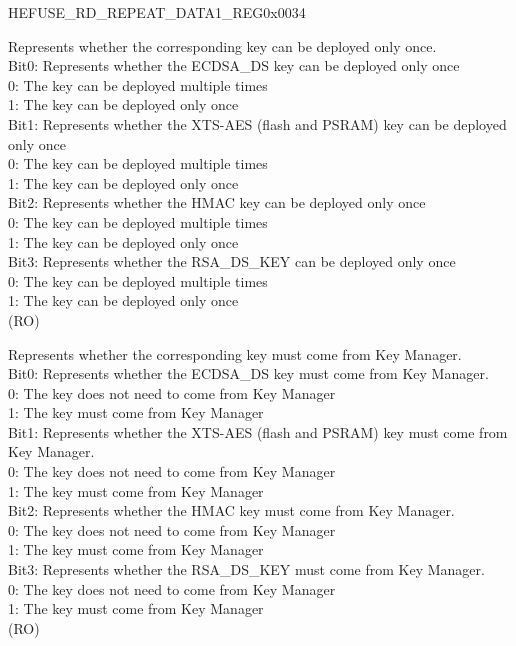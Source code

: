 \addtocounter{Regfloat}{-1}
\begin{register}{H}{EFUSE\_RD\_REPEAT\_DATA1\_REG}{0x0034}
\begin{regdesc}\begin{reglist}
\item [Continued from the previous page...]

\label{fielddesc:EFUSEKMDEPLOYONLYONCE}\item [EFUSE\_KM\_DEPLOY\_ONLY\_ONCE] Represents whether the corresponding key can be deployed only once.\\Bit0: Represents whether the ECDSA\_DS key can be deployed only once\\0: The key can be deployed multiple times\\1: The key can be deployed only once\\Bit1: Represents whether the XTS-AES (flash and PSRAM) key can be deployed only once\\0: The key can be deployed multiple times\\1: The key can be deployed only once\\Bit2: Represents whether the HMAC key can be deployed only once\\0: The key can be deployed multiple times\\1: The key can be deployed only once\\Bit3: Represents whether the RSA\_DS\_KEY can be deployed only once\\0: The key can be deployed multiple times\\1: The key can be deployed only once\\ (RO)
\label{fielddesc:EFUSEFORCEUSEKEYMANAGERKEY}\item [EFUSE\_FORCE\_USE\_KEY\_MANAGER\_KEY] Represents whether the corresponding key must come from Key Manager. \\Bit0: Represents whether the ECDSA\_DS key must come from Key Manager.\\0: The key does not need to come from Key Manager\\1: The key must come from Key Manager\\Bit1: Represents whether the XTS-AES (flash and PSRAM) key must come from Key Manager.\\0: The key does not need to come from Key Manager\\1: The key must come from Key Manager\\Bit2: Represents whether the HMAC key must come from Key Manager.\\0: The key does not need to come from Key Manager\\1: The key must come from Key Manager\\Bit3: Represents whether the RSA\_DS\_KEY must come from Key Manager.\\0: The key does not need to come from Key Manager\\1: The key must come from Key Manager\\ (RO)

\end{reglist}
\end{regdesc}
\end{register}

